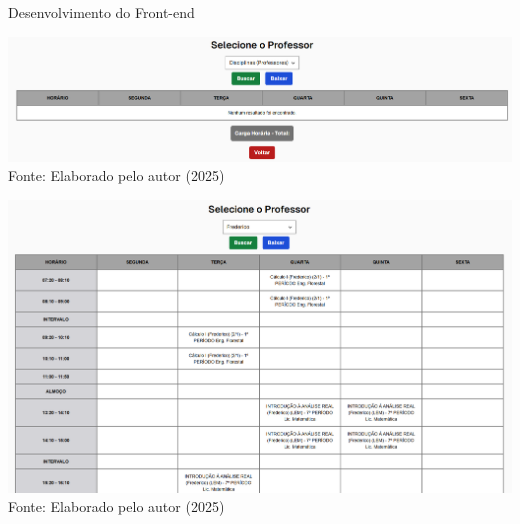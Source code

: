 \begin{frame}{Desenvolvimento do Front-end}
    \begin{minipage}{0.48\textwidth}
        \centering
        \includegraphics[width=1\textwidth]{figuras/front-5.png}
        \small Fonte: Elaborado pelo autor (2025)
    \end{minipage}
    \hfill
    \begin{minipage}{0.48\textwidth}
        \centering
        \includegraphics[width=1\textwidth]{figuras/front-6.png}
        \small Fonte: Elaborado pelo autor (2025)
    \end{minipage}
\end{frame}

